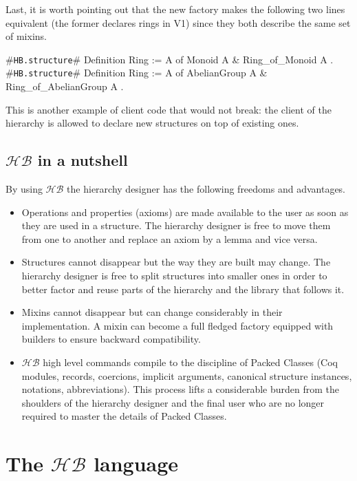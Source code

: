 \documentclass[a4paper,UKenglish,cleveref, autoref]{lipics-v2019}
\newcommand{\HB}{\ensuremath{\mathcal{HB}}}
\newcommand{\mixin}{mixin}
\newcommand{\mixins}{mixins}
\newcommand{\Mixins}{Mixins}
\newcommand{\factory}{factory}
\newcommand{\phantterms}{abbreviations}
\newcommand{\builder}{builder}
\newcommand{\hbstructure}{{\tt\color{dkgreen}HB.structure}}
\theoremstyle{implem}
\theoremstyle{implem}
\theoremstyle{command}
\theoremstyle{commands}
\begin{document}
Last, it is worth pointing out that the new \factory{} makes the following
two lines equivalent (the former declares
rings in V1) since they both describe the same set of \mixins{}.

\begin{coqcode}
#\hbstructure{}# Definition Ring := { A of Monoid A & Ring_of_Monoid A }.
#\hbstructure{}# Definition Ring := { A of AbelianGroup A & Ring_of_AbelianGroup A }.
\end{coqcode}

This is another example of client code that would not break: the client of the hierarchy is allowed to declare new
structures on top of existing ones.

\subsection{\HB{} in a nutshell}

By using \HB{} the hierarchy designer has the following freedoms and advantages.

\begin{itemize}
\item Operations and properties (axioms) are made available to the user
      as soon as they are used in a structure. The hierarchy designer
      is free to move them from one to another and replace an axiom
      by a lemma and vice versa.
\item Structures cannot disappear but the way they are built may change.
      The hierarchy designer is free to split structures into smaller
      ones in order to better factor and reuse parts of the hierarchy
      and the library that follows it.
\item \Mixins{} cannot disappear but can change considerably
      in their implementation. A \mixin{} can become a full fledged
      \factory{} equipped with \builder{}s to ensure backward compatibility.
\item \HB{} high level commands compile to
      the discipline of Packed Classes (Coq modules, records, coercions,
      implicit arguments, canonical structure instances, notations,
      \phantterms{}).
      This process lifts a considerable
      burden from the shoulders of the hierarchy designer and the final user
      who are no longer required to master the details of Packed Classes.
\end{itemize}

\section{The \HB{} language}\label{sec:language}
\end{document}
